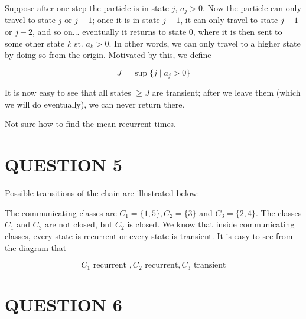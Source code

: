 \documentclass[a4paper]{article}
\begin{document}
Suppose after one step the particle is in state $ j $, $ a_{j} > 0 $. Now the particle can only travel to state $ j $ or $ j-1 $; once it is in state $ j-1 $, it can only travel to state $ j-1 $ or $ j-2 $, and so on... eventually it returns to state $ 0 $, where it is then sent to some other state $ k $ st. $ a_{k} > 0 $. In other words, we can only travel to a higher state by doing so from the origin. Motivated by this, we define 

\[ J = \sup\{ j \; | \; a_{j} > 0 \}  \]

It is now easy to see that all states $ \geq J $ are transient; after we leave them (which we will do eventually), we can never return there.

Not sure how to find the mean recurrent times. 

\section{QUESTION 5}

Possible transitions of the chain are illustrated below:
\begin{center}
\end{center}

The communicating classes are $ C_{1} = \{ 1,5 \}, C_{2} = \{ 3 \} $ and $ C_{3} = \{ 2,4 \} $. The classes $ C_{1} $ and $ C_{3} $ are not closed, but $ C_{2} $ is closed.
We know that inside communicating classes, every state is recurrent or every state is transient. It is easy to see from the diagram that

\[ C_{1} \text{ recurrent }, C_{2} \text{ recurrent}, C_{3} \text{ transient} \]


\section{QUESTION 6}
\end{document}
